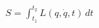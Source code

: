 \documentclass[preview]{standalone}
\begin{document}
\begin{align*}
S = \int_{t_1}^{t_2} L(q, \dot{q}, t) \, dt
\end{align*}
\end{document}
